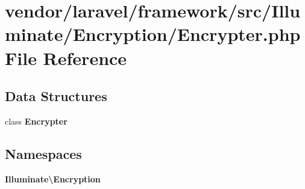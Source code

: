 \section{vendor/laravel/framework/src/\+Illuminate/\+Encryption/\+Encrypter.php File Reference}
\label{_encryption_2_encrypter_8php}
\subsection*{Data Structures}
\begin{DoxyCompactItemize}
\item 
class {\bf Encrypter}
\end{DoxyCompactItemize}
\subsection*{Namespaces}
\begin{DoxyCompactItemize}
\item 
 {\bf Illuminate\textbackslash{}\+Encryption}
\end{DoxyCompactItemize}
